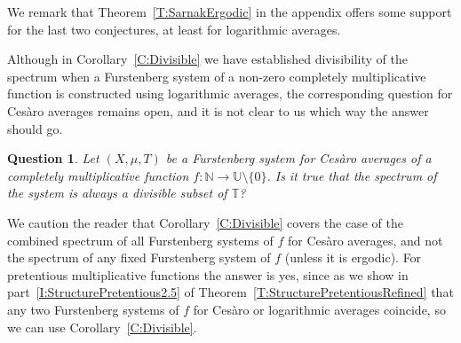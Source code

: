 \documentclass[11pt]{amsart}
\newtheorem*{question*}{Question}
\theoremstyle{definition}
\newcommand{\N}{{\mathbb N}}
\renewcommand{\S}{\mathbb{S}}
\newcommand{\T}{{\mathbb T}}
\newcommand{\U}{{\mathbb U}}
\begin{document}
We remark that Theorem~\ref{T:SarnakErgodic}  in the appendix offers some support for the last two conjectures,  at least for logarithmic averages.



Although in Corollary~\ref{C:Divisible} we have established divisibility of the spectrum when a Furstenberg system of a non-zero completely multiplicative function is constructed using logarithmic averages, the corresponding question for Ces\`aro averages remains open, and it is not clear to us which way the answer should go.
\begin{question*}\label{Q:SpecCesaro}
Let $(X,\mu,T)$ be a Furstenberg system for Ces\`aro averages of a completely multiplicative function $f\colon \N\to \U\setminus\{0\}$. Is it true that the spectrum of the system is always a divisible subset of $\T$?
\end{question*}
We caution the reader  that Corollary~\ref{C:Divisible} covers the case of the combined spectrum of all Furstenberg systems of $f$ for Ces\`aro averages, and not the spectrum of any fixed Furstenberg system of $f$ (unless it is ergodic). For pretentious multiplicative functions the answer is yes, since as we show in part~\eqref{I:StructurePretentious2.5} of Theorem~\ref{T:StructurePretentiousRefined} that  any two Furstenberg systems of $f$ for Ces\`aro or logarithmic averages coincide, so we can use Corollary~\ref{C:Divisible}.





\end{document}
